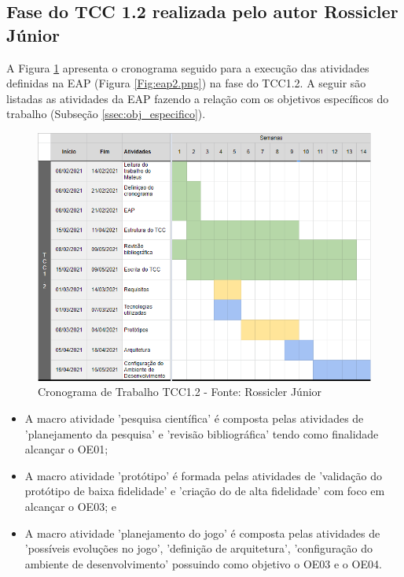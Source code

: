 \subsection{\textcolor{textmodified}{Fase do TCC 1.2 realizada pelo autor Rossicler Júnior}}
{\color{textadded}

A Figura \ref{Fig:cronograma_tcc1_2.png} apresenta o cronograma seguido para a execução das atividades definidas na EAP (Figura \ref{Fig:eap2.png}) na fase do TCC1.2. A seguir são listadas as atividades da EAP fazendo a relação com os objetivos específicos do trabalho (Subseção \ref{ssec:obj_especifico}).

\begin{figure}[htbp]
	\centering
		\includegraphics[keepaspectratio=true,scale=0.81]{figuras/cronograma_tcc1.2.png}
	\caption{\textcolor{textadded}{Cronograma de Trabalho TCC1.2 - Fonte: Rossicler Júnior}}
	\label{Fig:cronograma_tcc1_2.png}
\end{figure}

\begin{itemize}
    \item A macro atividade 'pesquisa científica' é composta pelas atividades de 'planejamento da pesquisa' e 'revisão bibliográfica' tendo como finalidade alcançar o OE01;
    \item A macro atividade 'protótipo' é formada pelas atividades de 'validação do protótipo de baixa fidelidade' e 'criação do de alta fidelidade' com foco em alcançar o OE03; e
    \item A macro atividade 'planejamento do jogo' é composta pelas atividades de 'possíveis evoluções no jogo', 'definição de arquitetura', 'configuração do ambiente de desenvolvimento' possuindo como objetivo o OE03 e o OE04.
\end{itemize}
}
\newpage
